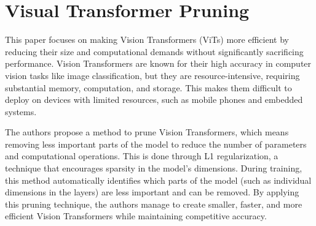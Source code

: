 \documentclass{report}
\begin{document}
	
	
	
	
	
	
	
	
	
	
	
	
	
	
	
	
	
	
	\chapter{Visual Transformer Pruning \cite{DBLP:journals/corr/abs-2104-08500}}
	This paper focuses on making Vision Transformers (ViTs) more efficient by reducing their size and computational demands without significantly sacrificing performance. Vision Transformers are known for their high accuracy in computer vision tasks like image classification, but they are resource-intensive, requiring substantial memory, computation, and storage. This makes them difficult to deploy on devices with limited resources, such as mobile phones and embedded systems.
	
	
	
	The authors propose a method to prune Vision Transformers, which means removing less important parts of the model to reduce the number of parameters and computational operations. This is done through L1 regularization, a technique that encourages sparsity in the model's dimensions. During training, this method automatically identifies which parts of the model (such as individual dimensions in the layers) are less important and can be removed. By applying this pruning technique, the authors manage to create smaller, faster, and more efficient Vision Transformers while maintaining competitive accuracy.
	
	
\end{document}
